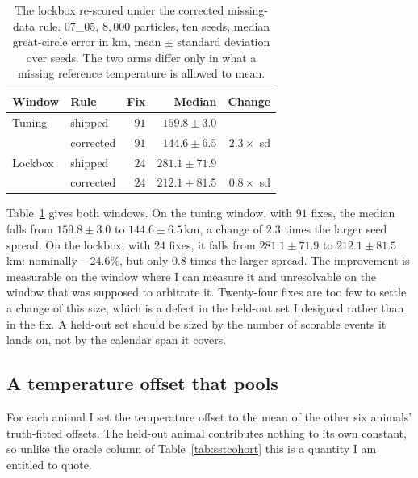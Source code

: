 \documentclass[conference]{IEEEtran}
\begin{document}
\begin{table}[t]
\caption{The lockbox re-scored under the corrected missing-data rule. 07\_05,
$8{,}000$ particles, ten seeds, median great-circle error in \si{\km}, mean
$\pm$ standard deviation over seeds. The two arms differ only in what a missing
reference temperature is allowed to mean.}
\label{tab:lockbox}
\centering
\small
\begin{tabular}{@{}llrrr@{}}
\toprule
Window & Rule & Fix & Median & Change \\
\midrule
Tuning  & shipped   & $91$ & $159.8 \pm 3.0$  &                \\
        & corrected & $91$ & $144.6 \pm 6.5$  & $2.3\times$ sd \\
Lockbox & shipped   & $24$ & $281.1 \pm 71.9$ &                \\
        & corrected & $24$ & $212.1 \pm 81.5$ & $0.8\times$ sd \\
\bottomrule
\end{tabular}
\end{table}

Table~\ref{tab:lockbox} gives both windows. On the tuning window, with $91$
fixes, the median falls from $159.8 \pm 3.0$ to $144.6 \pm 6.5$\,\si{\km}, a
change of $2.3$ times the larger seed spread. On the lockbox, with $24$ fixes,
it falls from $281.1 \pm 71.9$ to $212.1 \pm 81.5$\,\si{\km}: nominally
$-24.6\%$, but only $0.8$ times the larger spread. The improvement is
measurable on the window where I can measure it and unresolvable on the window
that was supposed to arbitrate it. Twenty-four fixes are too few to settle a
change of this size, which is a defect in the held-out set I designed rather
than in the fix. A held-out set should be sized by the number of scorable
events it lands on, not by the calendar span it covers.

\subsection{A temperature offset that pools}
For each animal I set the temperature offset to the mean of the other six
animals' truth-fitted offsets. The held-out animal contributes nothing to its
own constant, so unlike the oracle column of Table~\ref{tab:sstcohort} this is a
quantity I am entitled to quote.
\end{document}
